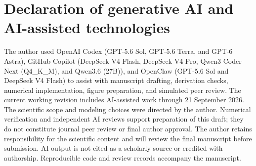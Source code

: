 \section*{Declaration of generative AI and AI-assisted technologies}

The author used OpenAI Codex (GPT-5.6 Sol, GPT-5.6 Terra, and GPT-6 Astra), GitHub Copilot (DeepSeek V4 Flash, DeepSeek V4 Pro, Qwen3-Coder-Next (Q4\_K\_M), and Qwen3.6 (27B)), and OpenClaw (GPT-5.6 Sol and DeepSeek V4 Flash) to assist with manuscript drafting, derivation checks, numerical implementation, figure preparation, and simulated peer review. The current working revision includes AI-assisted work through 21 September 2026. The scientific scope and modeling choices were directed by the author. Numerical verification and independent AI reviews support preparation of this draft; they do not constitute journal peer review or final author approval. The author retains responsibility for the scientific content and will review the final manuscript before submission. AI output is not cited as a scholarly source or credited with authorship. Reproducible code and review records accompany the manuscript.
